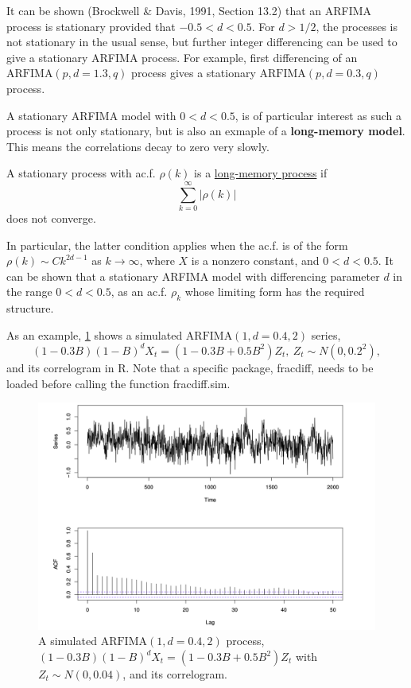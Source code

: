 It can be shown (Brockwell \& Davis, 1991, Section 13.2) that an ARFIMA process is stationary provided that 
$-0.5 < d < 0.5$. For $d > 1/2$, the processes is not stationary in the usual sense, but further integer 
differencing can be used to give a stationary ARFIMA process. For example, first differencing of an 
$\mathrm{ARFIMA}(p, d=1.3, q)$ process gives a stationary $\mathrm{ARFIMA}(p, d=0.3, q)$ process.

A stationary ARFIMA model with $0 < d < 0.5$, is of particular interest as such a process is not only 
stationary, but is also an exmaple of a \textbf{long-memory model}. This means the correlations decay to zero 
very slowly.

\begin{definition*}[]
A stationary process with ac.f. $\rho(k)$ is a \underline{long-memory process} if 
\[ \sum_{k = 0}^{\infty} |\rho(k)| \]
does not converge.
\end{definition*}

In particular, the latter condition applies when the ac.f. is of the form $\rho(k) \sim Ck^{2d - 1}$ as 
$k \to \infty$, where $X$ is a nonzero constant, and $0 < d < 0.5$. It can be shown that a stationary ARFIMA 
model with differencing parameter $d$ in the range $0 < d < 0.5$, as an ac.f. $\rho_k$ whose limiting form has 
the required structure.

As an example, \cref{fig:3.8} shows a simulated $\mathrm{ARFIMA}(1, d=0.4, 2)$ series, 
\[ (1 - 0.3B)(1 - B)^d X_t = (1 - 0.3B + 0.5B^2)Z_t, \ Z_t \sim N(0, 0.2^2), \]
and its correlogram in R. Note that a specific package, fracdiff, needs to be loaded before calling the function 
fracdiff.sim.

\begin{figure}[h]
	\centering
	\includegraphics[width=\textwidth]{Chapter 3/fig3-8.png}
	\caption{A simulated $\mathrm{ARFIMA}(1, d=0.4, 2)$ process, $(1 - 0.3B)(1 - B)^d X_t 
	= (1 - 0.3B + 0.5B^2)Z_t$ with $Z_t \sim N(0, 0.04)$, and its correlogram.}
	\label{fig:3.8}
\end{figure}

